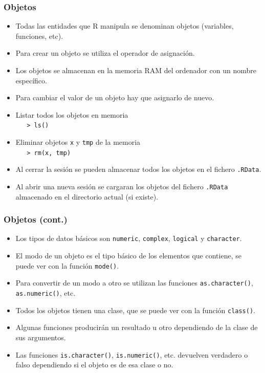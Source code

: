 \documentclass{beamer}
\begin{document}
\begin{frame}[fragile]
\frametitle{Objetos}

\begin{itemize}
\item Todas las entidades que R manipula se denominan objetos (variables, funciones, etc).
\item Para crear un objeto se utiliza el operador de asignación.
\item Los objetos se almacenan en la memoria RAM del ordenador con un nombre específico.
\item Para cambiar el valor de un objeto hay que asignarlo de nuevo.
\item Listar todos los objetos en memoria \\ \verb+   > ls()+
\item Eliminar objetos \texttt{x} y \texttt{tmp} de la memoria \\ \verb+   > rm(x, tmp)+
\item Al cerrar la sesión se pueden almacenar todos los objetos en el fichero \texttt{.RData}.
\item Al abrir una nueva sesión se cargaran los objetos del fichero \texttt{.RData} almacenado en el directorio actual (si existe).
\end{itemize}

\end{frame}


\begin{frame}[fragile]
\frametitle{Objetos (cont.)}
\begin{itemize}
\item Los tipos de datos básicos son \texttt{numeric}, \texttt{complex}, \texttt{logical} y \texttt{character}.
\item El modo de un objeto es el tipo básico de los elementos que contiene, se puede ver con la función \texttt{mode()}.
\item Para convertir de un modo a otro se utilizan las funciones \verb+as.character()+, \verb+as.numeric()+, etc.
\item Todos los objetos tienen una clase, que se puede ver con la función \texttt{class()}.
\item Algunas funciones producirán un resultado u otro dependiendo de la clase de sus argumentos.
\item Las funciones \verb+is.character()+, \verb+is.numeric()+, etc. devuelven verdadero o falso dependiendo si el objeto es de esa clase o no.
\end{itemize}
\end{frame}
\end{document}
